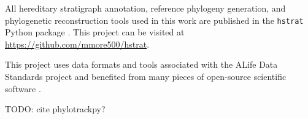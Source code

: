 All hereditary stratigraph annotation, reference phylogeny generation, and phylogenetic reconstruction tools used in this work are published in the \texttt{hstrat} Python package \citep{moreno2022hstrat}.
This project can be visited at \url{https://github.com/mmore500/hstrat}.

This project uses data formats and tools associated with the ALife Data Standards project \citep{lalejini2019data} and benefited from many pieces of open-source scientific software \citep{ofria2020empirical,sand2014tqdist,2020SciPy-NMeth,harris2020array,reback2020pandas,mckinney-proc-scipy-2010,sukumaran2010dendropy,cock2009biopython,torchiano2016effsize,waskom2021seaborn,hunter2007matplotlib,moreno2024apc,moreno2024qspool,moreno2023teeplot,hagen2021gen3sis,ofria2004avida,torchiano2016effsize}.

TODO: cite phylotrackpy?
